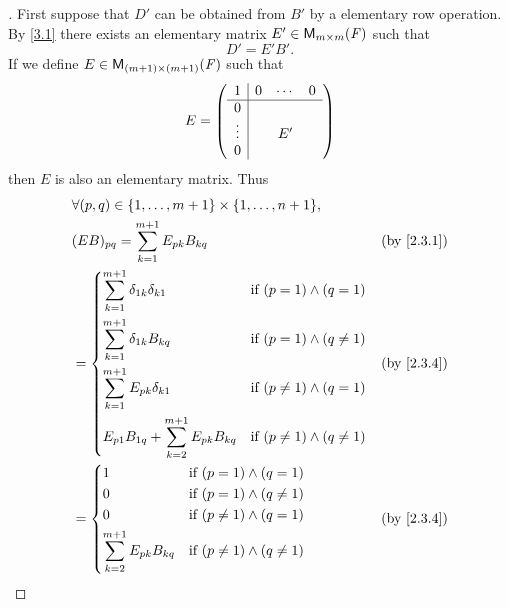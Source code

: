 \begin{proof}[]
  First suppose that \(D'\) can be obtained from \(B'\) by a elementary row operation.
  By \cref{3.1} there exists an elementary matrix \(E' \in \ms[m][m][\F]\) such that
  \[
    D' = E' B'.
  \]
  If we define \(E \in \ms[(m + 1)][(m + 1)][\F]\) such that
  \[
    E = \left\lparen\begin{array}{c|ccc}
        1      & 0 & \cdots & 0 \\
        \hline
        0      &   &        &   \\
        \vdots &   & E'     &   \\
        0      &   &        &
      \end{array}\right\rparen
  \]
  then \(E\) is also an elementary matrix.
  Thus
  \begin{align*}
     & \forall (p, q) \in \set{1, \dots, m + 1} \times \set{1, \dots, n + 1},                                             \\
     & (E B)_{p q} = \sum_{k = 1}^{m + 1} E_{p k} B_{k q}                                                 &  & \by{2.3.1} \\
     & = \begin{dcases}
           \sum_{k = 1}^{m + 1} \delta_{1 k} \delta_{k 1}         & \text{if } (p = 1) \land (q = 1)       \\
           \sum_{k = 1}^{m + 1} \delta_{1 k} B_{k q}              & \text{if } (p = 1) \land (q \neq 1)    \\
           \sum_{k = 1}^{m + 1} E_{p k} \delta_{k 1}              & \text{if } (p \neq 1) \land (q = 1)    \\
           E_{p 1} B_{1 q} + \sum_{k = 2}^{m + 1} E_{p k} B_{k q} & \text{if } (p \neq 1) \land (q \neq 1)
         \end{dcases} &  & \by{2.3.4}                  \\
     & = \begin{dcases}
           1                                    & \text{if } (p = 1) \land (q = 1)       \\
           0                                    & \text{if } (p = 1) \land (q \neq 1)    \\
           0                                    & \text{if } (p \neq 1) \land (q = 1)    \\
           \sum_{k = 2}^{m + 1} E_{p k} B_{k q} & \text{if } (p \neq 1) \land (q \neq 1)
         \end{dcases}                   &  & \by{2.3.4}                                    \\

\end{align*}
\end{proof}
